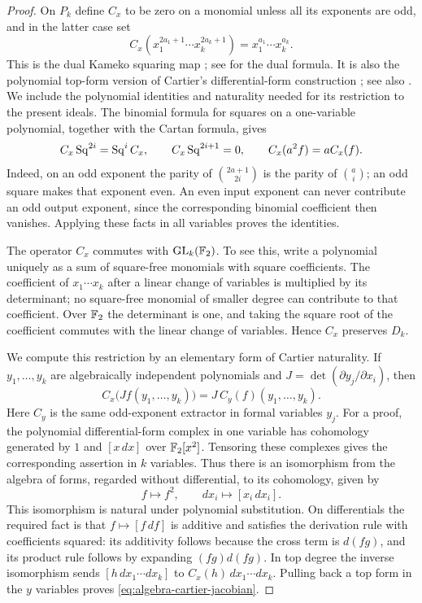 \begin{proof}
On $P_k$ define $C_x$ to be zero on a monomial unless all its exponents
are odd, and in the latter case set
\[
 C_x(x_1^{2a_1+1}\cdots x_k^{2a_k+1})
   =x_1^{a_1}\cdots x_k^{a_k}.
\]
This is the dual Kameko squaring map
\cite{Kameko1990}; see \cite[\S2, p.~4069]{Hung2005} for the
dual formula. It is also the polynomial top-form version of
Cartier's differential-form construction \cite{Cartier1957};
see also \cite[Chapter~II, \S6, pp.~200--203]{Cartier1958}.
We include the polynomial identities and naturality needed for its
restriction to the present ideals.
The binomial formula for squares on a one-variable polynomial, together
with the Cartan formula, gives
\begin{equation}\label{eq:algebra-cartier-action}
 C_x\operatorname{Sq}^{2i}=\operatorname{Sq}^iC_x,\qquad C_x\operatorname{Sq}^{2i+1}=0,
 \qquad C_x(a^2f)=aC_x(f).
\end{equation}
Indeed, on an odd exponent the parity of
$\binom{2a+1}{2i}$ is the parity of $\binom ai$; an odd square makes
that exponent even.  An even input exponent can never contribute an
odd output exponent, since the corresponding binomial coefficient then
vanishes.  Applying these facts in all variables proves the identities.

The operator $C_x$ commutes with $\operatorname{GL}_k(\mathbb F_2)$.  To see this, write a
polynomial uniquely as a sum of square-free monomials with square
coefficients.  The coefficient of $x_1\cdots x_k$ after a linear change
of variables is multiplied by its determinant; no square-free monomial
of smaller degree can contribute to that coefficient.  Over $\mathbb F_2$
the determinant is one, and taking the square root of the coefficient
commutes with the linear change of variables.  Hence $C_x$ preserves
$D_k$.

We compute this restriction by an elementary form of Cartier
naturality.  If $y_1,\ldots,y_k$ are algebraically independent
polynomials and $J=\det(\partial y_j/\partial x_i)$, then
\begin{equation}\label{eq:algebra-cartier-jacobian}
 C_x\bigl(Jf(y_1,\ldots,y_k)\bigr)
       =J\,C_y(f)(y_1,\ldots,y_k).
\end{equation}
Here $C_y$ is the same odd-exponent extractor in formal variables $y_j$.
For a proof, the polynomial differential-form complex in one variable
has cohomology generated by $1$ and $[x\,dx]$ over $\mathbb F_2[x^2]$.
Tensoring these complexes gives the corresponding assertion in $k$
variables.  Thus there is an isomorphism from the algebra of forms,
regarded without differential, to its cohomology, given by
\[
 f\longmapsto f^2,\qquad dx_i\longmapsto[x_i\,dx_i].
\]
This isomorphism is natural under polynomial substitution.  On
differentials the required fact is that $f\mapsto[f\,df]$ is additive
and satisfies the derivation rule with coefficients squared: its
additivity follows because the cross term is $d(fg)$, and its product
rule follows by expanding $(fg)d(fg)$.  In top degree the inverse
isomorphism sends $[h\,dx_1\cdots dx_k]$ to
$C_x(h)\,dx_1\cdots dx_k$.  Pulling back a top form in the $y$
variables proves \eqref{eq:algebra-cartier-jacobian}.


\end{proof}
